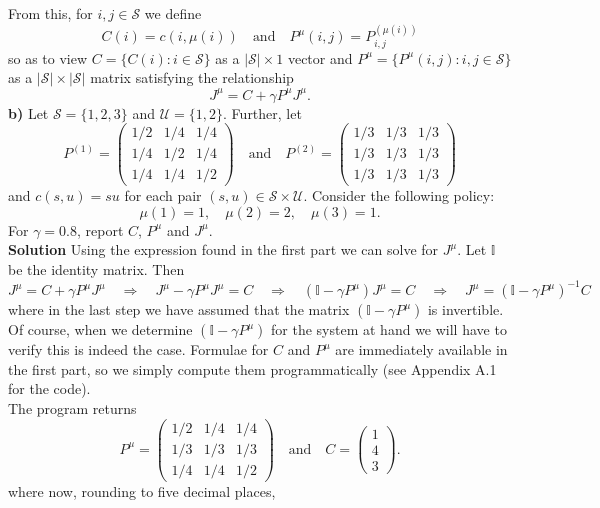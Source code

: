 \documentclass[11pt, letterpaper]{article}
\newcommand{\mbb}[1]{\mathbb{#1}}
\newcommand{\mc}[1]{\mathcal{#1}}
\begin{document}
    From this, for $i,j\in\mc{S}$ we define
    \[C(i)=c(i,\mu(i))\quad\text{and}\quad P^\mu(i,j)=P^{(\mu(i))}_{i,j}\]
    so as to view $C=\{C(i):i\in\mc{S}\}$ as a $|\mc{S}|\times 1$ vector and $P^\mu=\{P^\mu(i,j):i,j\in\mc{S}\}$ as a $|\mc{S}|\times|\mc{S}|$ matrix satisfying the relationship
    \[J^\mu=C+\gamma P^\mu J^\mu.\tag*{$\qed$}\]
    {\bf b)} Let $\mc{S}=\{1,2,3\}$ and $\mc{U}=\{1,2\}$. Further, let
    \[P^{(1)}=\begin{pmatrix}
        1/2 & 1/4 & 1/4\\
        1/4 & 1/2 & 1/4\\
        1/4 & 1/4 & 1/2
    \end{pmatrix}\quad\text{and}\quad P^{(2)}=\begin{pmatrix}
        1/3 & 1/3 & 1/3\\
        1/3 & 1/3 & 1/3\\
        1/3 & 1/3 & 1/3
    \end{pmatrix}\]
    and $c(s,u)=su$ for each pair $(s,u)\in\mc{S}\times\mc{U}$. Consider the following policy:
    \[\mu(1)=1,\quad\mu(2)=2,\quad\mu(3)=1.\]
    For $\gamma=0.8$, report $C$, $P^\mu$ and $J^\mu$.\\[10pt]
    {\bf Solution} Using the expression found in the first part we can solve for $J^\mu$. Let $\mbb{I}$ be the identity matrix. Then
    \[J^\mu=C+\gamma P^\mu J^\mu\quad\Rightarrow\quad J^\mu-\gamma P^\mu J^\mu=C\quad\Rightarrow\quad (\mbb{I}-\gamma P^\mu)J^\mu=C\quad\Rightarrow\quad J^\mu=(\mbb{I}-\gamma P^\mu)^{-1}C\] 
    where in the last step we have assumed that the matrix $(\mbb{I}-\gamma P^\mu)$ is invertible. Of course, when we determine $(\mbb{I}-\gamma P^\mu)$ for the system at hand we will have to verify this is indeed the case.
    Formulae for $C$ and $P^\mu$ are immediately available in the first part, so we simply compute them programmatically (see Appendix A.1 for the code).\\[10pt]
    The program returns
    \[P^\mu=\begin{pmatrix}
        1/2 & 1/4 & 1/4\\
        1/3 & 1/3 & 1/3\\
        1/4 & 1/4 & 1/2
    \end{pmatrix}\quad\text{and}\quad C=\begin{pmatrix}
        1\\
        4\\
        3
    \end{pmatrix}.\]
    where now, rounding to five decimal places,
\end{document}

